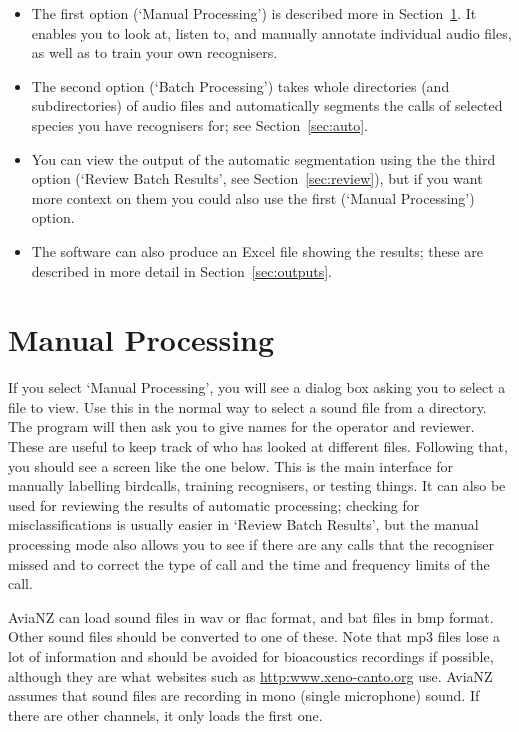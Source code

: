 \documentclass{article}
\begin{document}
\begin{itemize}
\item The first option (`Manual Processing') is described more in Section~\ref{sec:manual}. It enables you to look at, listen to, and manually annotate individual audio files, as well as to train your own recognisers. 
\item The second option (`Batch Processing') takes whole directories (and subdirectories) of audio files and automatically segments the calls of selected species you have recognisers for; see Section~\ref{sec:auto}. 
\item You can view the output of the automatic segmentation using the the third option (`Review Batch Results', see Section~\ref{sec:review}), but if you want more context on them you could also use the first (`Manual Processing') option. 
\item The software can also produce an Excel file showing the results; these are described in more detail in Section~\ref{sec:outputs}. 
\end{itemize}

\newpage
\section{Manual Processing}
\label{sec:manual}

If you select `Manual Processing', you will see a dialog box asking you to select a file to view. Use this in the normal way to select a sound file from a directory. The program will then ask you to give names for the operator and reviewer. These are useful to keep track of who has looked at different files. Following that, you should see a screen like the one below. This is the main interface for manually labelling birdcalls, training recognisers, or testing things. It can also be used for reviewing the results of automatic processing; checking for misclassifications is usually easier in `Review Batch Results', but the manual processing mode also allows you to see if there are any calls that the recogniser missed and to correct the type of call and the time and frequency limits of the call.

AviaNZ can load sound files in wav or flac format, and bat files in bmp format. Other sound files should be converted to one of these. Note that mp3 files lose a lot of information and should be avoided for bioacoustics recordings if possible, although they are what websites such as \url{http:www.xeno-canto.org} use. AviaNZ assumes that sound files are recording in mono (single microphone) sound. If there are other channels, it only loads the first one.
\end{document}
